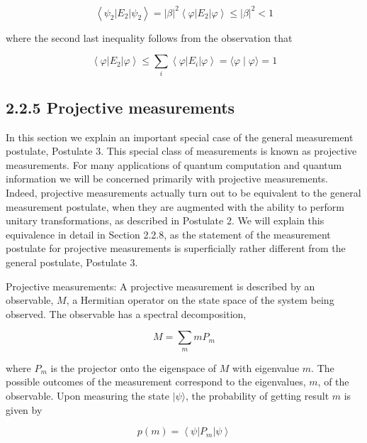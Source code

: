 \documentclass[10pt]{article}
\begin{document}
\begin{equation*}
\left\langle\psi_{2}\left|E_{2}\right| \psi_{2}\right\rangle=|\beta|^{2}\left\langle\varphi\left|E_{2}\right| \varphi\right\rangle \leq|\beta|^{2}<1 \tag{2.100}
\end{equation*}


where the second last inequality follows from the observation that


\begin{equation*}
\left\langle\varphi\left|E_{2}\right| \varphi\right\rangle \leq \sum_{i}\left\langle\varphi\left|E_{i}\right| \varphi\right\rangle=\langle\varphi \mid \varphi\rangle=1 \tag{2.101}
\end{equation*}


\subsection*{2.2.5 Projective measurements}
In this section we explain an important special case of the general measurement postulate, Postulate 3. This special class of measurements is known as projective measurements. For many applications of quantum computation and quantum information we will be concerned primarily with projective measurements. Indeed, projective measurements actually turn out to be equivalent to the general measurement postulate, when they are augmented with the ability to perform unitary transformations, as described in Postulate 2. We will explain this equivalence in detail in Section 2.2.8, as the statement of the measurement postulate for projective measurements is superficially rather different from the general postulate, Postulate 3.

Projective measurements: A projective measurement is described by an observable, $M$, a Hermitian operator on the state space of the system being observed. The observable has a spectral decomposition,


\begin{equation*}
M=\sum_{m} m P_{m} \tag{2.102}
\end{equation*}


where $P_{m}$ is the projector onto the eigenspace of $M$ with eigenvalue $m$. The possible outcomes of the measurement correspond to the eigenvalues, $m$, of the observable. Upon measuring the state $|\psi\rangle$, the probability of getting result $m$ is\\
given by


\begin{equation*}
p(m)=\left\langle\psi\left|P_{m}\right| \psi\right\rangle \tag{2.103}
\end{equation*}
\end{document}

